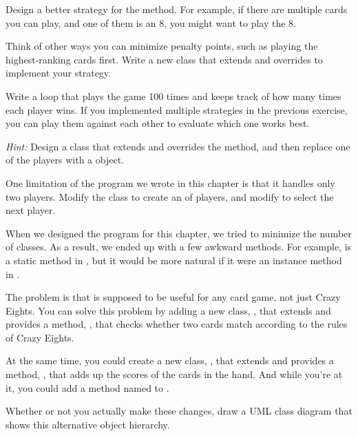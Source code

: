 \begin{exercise}  %

Design a better strategy for the  method.
For example, if there are multiple cards you can play, and one of them is an 8, you might want to play the 8.


Think of other ways you can minimize penalty points, such as playing the highest-ranking cards first.
Write a new class that extends  and overrides  to implement your strategy.

\end{exercise}


\begin{exercise}  %

Write a loop that plays the game 100 times and keeps track of how many times each player wins.
If you implemented multiple strategies in the previous exercise, you can play them against each other to evaluate which one works best.

{\em Hint:} Design a  class that extends  and overrides the  method, and then replace one of the players with a  object.

\end{exercise}


\begin{exercise}  %

One limitation of the program we wrote in this chapter is that it handles only two players.
Modify the  class to create an  of players, and modify  to select the next player.

\end{exercise}


\begin{exercise}  %

When we designed the program for this chapter, we tried to minimize the number of classes.
As a result, we ended up with a few awkward methods.
For example,  is a static method in , but it would be more natural if it were an instance method in .

The problem is that  is supposed to be useful for any card game, not just Crazy Eights.
You can solve this problem by adding a new class, , that extends  and provides a method, , that checks whether two cards match according to the rules of Crazy Eights.

At the same time, you could create a new class, , that extends  and provides a method, , that adds up the scores of the cards in the hand.
And while you're at it, you could add a method named  to .

Whether or not you actually make these changes, draw a UML class diagram that shows this alternative object hierarchy.

\end{exercise}
